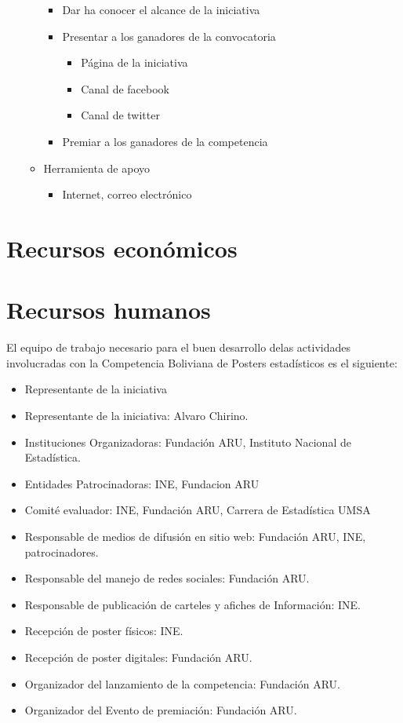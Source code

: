 \documentclass{article}
\begin{document}
\begin{enumerate}
\begin{itemize}
\begin{itemize}
\item Dar ha conocer el alcance de la iniciativa
\item Presentar a los ganadores de la convocatoria
\begin{itemize}
\item Página de la iniciativa 
\item Canal de facebook
\item Canal de twitter
\end{itemize}
\item Premiar a los ganadores de la competencia
\end{itemize}
\item Herramienta de apoyo
\begin{itemize}
\item Internet, correo electrónico
\end{itemize}
\end{itemize}
\end{enumerate}


\section{Recursos económicos}

\section{Recursos humanos}

El equipo de trabajo necesario para el buen desarrollo delas actividades involucradas con la Competencia Boliviana de Posters estadísticos es el siguiente: \\

\begin{itemize}
\item  Representante de la iniciativa
\item Representante de la iniciativa: Alvaro Chirino.  
\item Instituciones Organizadoras: Fundación ARU, Instituto Nacional de Estadística.
\item Entidades Patrocinadoras: INE, Fundacion ARU
\item Comité evaluador: INE, Fundación ARU, Carrera de Estadística UMSA
\item Responsable de medios de difusión en sitio web:  Fundación ARU, INE, patrocinadores. 
\item Responsable del manejo de redes sociales: Fundación ARU.
\item Responsable de publicación de carteles y afiches de Información: INE.
\item Recepción de poster físicos: INE.
\item Recepción de poster digitales: Fundación ARU.
\item Organizador del lanzamiento de la competencia: Fundación ARU.
\item Organizador del Evento de premiación: Fundación ARU.

\end{itemize}
\end{document}
